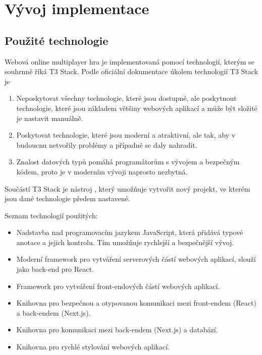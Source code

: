 \chapter{Vývoj implementace}

\section{Použité technologie}

Webová online multiplayer hra je implementovaná pomocí technologií, kterým se
souhrnně říká T3 Stack. Podle oficiální dokumentace \parencite{t3stack} úkolem
technologií T3 Stack je

\begin{enumerate}
    \item {} Neposkytovat všechny technologie, které jsou
        dostupné, ale poskytnout technologie, které jsou základem většiny
        webových aplikací a může být složité je nastavit manuálně.
    \item {} Poskytovat technologie, které jsou
        moderní a atraktivní, ale tak, aby v budoucnu netvořily problémy a
        případně se daly nahradit.
    \item {} Znalost datových typů pomáhá
        programátorům s vývojem a bezpečným kódem, proto je v moderním vývoji
        naprosto nezbytná.
\end{enumerate}


Součástí T3 Stack je nástroj , který umožňuje vytvořit nový
projekt, ve kterém jsou dané technologie předem nastavené.

Seznam technologií použitých:
\begin{itemize}
    \item {} Nadstavba nad programovacím jazykem JavaScript, která
        přidává typové anotace a jejich kontrolu. Tím umožňuje rychlejší a
        bezpečnější vývoj.
    \item {} Moderní framework pro vytváření serverových částí
        webových  aplikací, slouží jako back-end pro React.
    \item {} Framework pro vytváření front-endových částí webových
        aplikací.
    \item {} Knihovna pro bezpečnou a otypovanou komunikaci mezi
        front-endem (React) a back-endem (Next.js).
    \item {} Knihovna pro komunikaci mezi back-endem (Next.js) a
        databází.
    \item {} Knihovna pro rychlé stylování webových aplikací.
\end{itemize}

